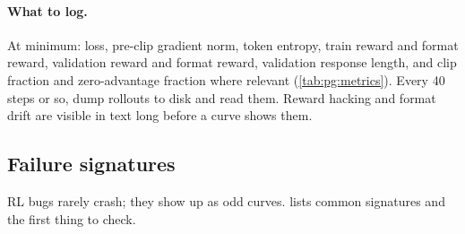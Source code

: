 \paragraph{What to log.} At minimum: loss, pre-clip gradient norm, token entropy, train reward and
format reward, validation reward and format reward, validation response length, and clip fraction and
zero-advantage fraction where relevant (\cref{tab:pg:metrics}). Every 40 steps or so, dump rollouts to
disk and read them. Reward hacking and format drift are visible in text long before a curve shows
them.

\subsection{Failure signatures}\label{sec:proj5:failures}

RL bugs rarely crash; they show up as odd curves.  lists common signatures and
the first thing to check.

